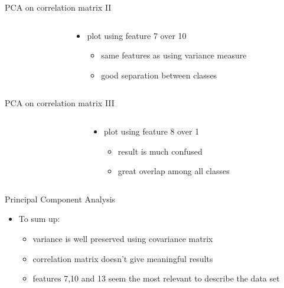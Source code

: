\documentclass{beamer}
\begin{document}
\begin{frame}{PCA on correlation matrix II}
\begin{columns}[t]
\begin{column}{.5\textwidth}
\end{column}
\begin{column}{.5\textwidth}
\begin{itemize}
\item{
  plot using feature 7 over 10
  }
\begin{itemize}
  \item{
    same features as using variance measure
    }
  \item{
    good separation between classes
  }
  \end{itemize}
  \end{itemize}
\end{column}
\end{columns}
\end{frame}

\begin{frame}{PCA on correlation matrix III}
\begin{columns}[t]
\begin{column}{.5\textwidth}
\end{column}
\begin{column}{.5\textwidth}
\begin{itemize}
\item{
  plot using feature 8 over 1
  }
\begin{itemize}
  \item{
    result is much confused
    }
  \item{
    great overlap among all classes
  }
  \end{itemize}
  \end{itemize}
\end{column}
\end{columns}
\end{frame}

\begin{frame}{Principal Component Analysis}
  \begin{itemize}
  \item
    To sum up:
    \begin{itemize}
    \item
      variance is well preserved using covariance matrix
    \item
      correlation matrix doesn't give meaningful results
    \item
      features 7,10 and 13 seem the most relevant to describe the data set
    \end{itemize}
  \end{itemize}
\end{frame}
\end{document}
